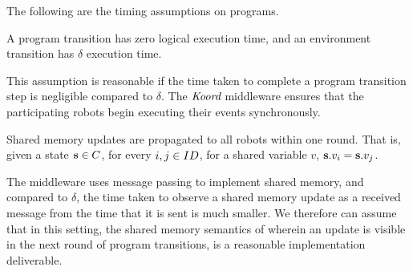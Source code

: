 
The following are the timing assumptions on \lgname programs.
\begin{assumption}
    A program transition has zero logical execution time, and an environment transition has $\delta$ execution time.
\end{assumption}
This assumption is reasonable if the time taken to complete a program transition step is negligible compared to $\delta$.  The $\emph{Koord}$ middleware ensures that the participating robots begin executing their events synchronously.

\begin{assumption}
    \label{shared}
    Shared memory updates are propagated to all robots within one round. That is, given a state ${\textbf{s}}\in C$, for every  $i,j \in ID$, for a shared variable $v$, ${\textbf{s}}.v_i = {\textbf{s}}.v_j$.
\end{assumption}
The \lgname middleware uses message passing to implement shared memory, and compared to $\delta$, the time taken to observe a shared memory update as a received message from the time that it is sent is much smaller. We therefore can assume that in this setting, the shared memory semantics of \lgname wherein an update is visible in the next round of program transitions, is a reasonable implementation deliverable.

